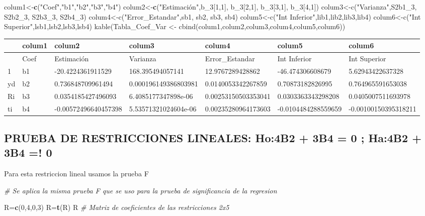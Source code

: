 \documentclass[
]{article}
\newenvironment{Shaded}{\begin{snugshade}}{\end{snugshade}}
\newcommand{\CommentTok}[1]{\textcolor[rgb]{0.56,0.35,0.01}{\textit{#1}}}
\newcommand{\DecValTok}[1]{\textcolor[rgb]{0.00,0.00,0.81}{#1}}
\newcommand{\KeywordTok}[1]{\textcolor[rgb]{0.13,0.29,0.53}{\textbf{#1}}}
\newcommand{\NormalTok}[1]{#1}
\newcommand{\StringTok}[1]{\textcolor[rgb]{0.31,0.60,0.02}{#1}}
\begin{document}
\begin{Shaded}
\begin{Highlighting}[]
\NormalTok{colum1<-}\KeywordTok{c}\NormalTok{(}\StringTok{"Coef"}\NormalTok{,}\StringTok{"b1"}\NormalTok{,}\StringTok{"b2"}\NormalTok{,}\StringTok{"b3"}\NormalTok{,}\StringTok{"b4"}\NormalTok{)}
\NormalTok{colum2<-}\KeywordTok{c}\NormalTok{(}\StringTok{"Estimación",b_3[1,1], b_3[2,1], b_3[3,1], b_3[4,1])}
\StringTok{colum3<-c("}\NormalTok{Varianza}\StringTok{",S2b1_3, S2b2_3, S2b3_3, S2b4_3)}
\StringTok{colum4<-c("}\NormalTok{Error_Estandar}\StringTok{",sb1, sb2, sb3, sb4)}
\StringTok{colum5<-c("}\NormalTok{Int Inferior}\StringTok{",lib1,lib2,lib3,lib4)}
\StringTok{colum6<-c("}\NormalTok{Int Superior}\StringTok{",lsb1,lsb2,lsb3,lsb4)}
\StringTok{kable(Tabla_Coef_Var <- cbind(colum1,colum2,colum3,colum4,colum5,colum6))}
\end{Highlighting}
\end{Shaded}

\begin{longtable}[]{@{}lllllll@{}}
\toprule
& colum1 & colum2 & colum3 & colum4 & colum5 & colum6\tabularnewline
\midrule
\endhead
& Coef & Estimación & Varianza & Error\_Estandar & Int Inferior & Int
Superior\tabularnewline
1 & b1 & -20.4224361911529 & 168.395494057141 & 12.9767289428862 &
-46.474306608679 & 5.62943422637328\tabularnewline
yd & b2 & 0.736848709961494 & 0.000196149386803981 & 0.0140053342267859
& 0.70873182826995 & 0.764965591653038\tabularnewline
Ri & b3 & 0.0354185427496093 & 6.4085177347898e-06 & 0.00253150503353041
& 0.0303363343298208 & 0.0405007511693978\tabularnewline
ti & b4 & -0.00572496640457398 & 5.53571321024604e-06 &
0.00235280964173603 & -0.0104484288559659 &
-0.00100150395318211\tabularnewline
\bottomrule
\end{longtable}

\hypertarget{prueba-de-restricciones-lineales-ho4b2-3b4-0-ha4b2-3b4-0}{%
\subsection{PRUEBA DE RESTRICCIONES LINEALES: Ho:4B2 + 3B4 = 0 ; Ha:4B2
+ 3B4 =!
0}\label{prueba-de-restricciones-lineales-ho4b2-3b4-0-ha4b2-3b4-0}}

Para esta restriccion lineal usamos la prueba F

\begin{Shaded}
\begin{Highlighting}[]
\CommentTok{# Se aplica la misma prueba F que se uso para la prueba de significancia de la regresion }

\NormalTok{R=}\KeywordTok{c}\NormalTok{(}\DecValTok{0}\NormalTok{,}\DecValTok{4}\NormalTok{,}\DecValTok{0}\NormalTok{,}\DecValTok{3}\NormalTok{)}
\NormalTok{R=}\KeywordTok{t}\NormalTok{(R)}
\NormalTok{R }\CommentTok{#  Matriz de coeficientes de las restricciones 2x5}
\end{Highlighting}
\end{Shaded}
\end{document}
